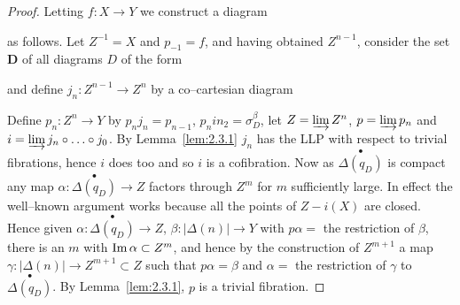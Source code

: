 \documentclass[../main]{subfiles}
\begin{document}
\begin{proof}
Letting $f \colon X \to Y$ we construct a diagram
\begin{center}
\end{center}
as follows. Let $Z^{-1} = X$ and $p_{-1} = f$, and having obtained $Z^{n - 1}$, consider the set $\mathbf D$ of all diagrams $D$ of the form 

\begin{center}
\end{center} 
and define $j_n \colon Z^{n - 1} \to Z^n$ by a co--cartesian diagram
\begin{center}
\end{center} 
Define $p_n \colon Z^n \to Y$ by $p_n j_n = p_{n - 1}$, $p_n i n_2 = \sigma^\beta_D$, let $Z = \varinjlim Z^n$, $p = \varinjlim p_n$ and $i = \varinjlim j_n \circ \ldots \circ j_0$. By Lemma~\ref{lem:2.3.1} $j_n$ has the LLP with respect to trivial fibrations, hence $i$ does too and so $i$ is a cofibration. Now as $\overset{\bullet}{\Delta(q_D)}$ is compact any map $\alpha \colon \overset{\bullet}{\Delta(q_D)} \to Z$ factors through $Z^m$ for $m$ sufficiently large. In effect the well--known argument works because all the points of $Z - i(X)$ are closed. Hence given $\alpha \colon \overset{\bullet}{\Delta(q_D)} \to Z$, $\beta \colon |\Delta(n)| \to Y$ with $p\alpha = $ the restriction of $\beta$, there is an $m$ with $\operatorname{Im} \alpha \subset Z^m$, and hence by the construction of $Z^{m + 1}$ a map $\gamma :|\Delta(n)| \to Z^{m + 1} \subset Z$ such that $p \alpha = \beta$ and $\alpha = $ the restriction of $\gamma$ to $\overset{\bullet}{\Delta(q_D)}$. By Lemma~\ref{lem:2.3.1}, $p$ is a trivial fibration. 
\end{proof} 
\end{document}
